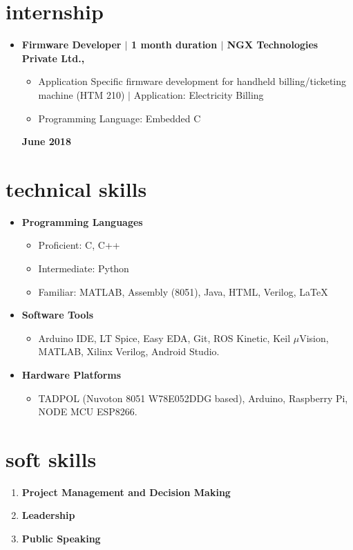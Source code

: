 \documentclass[margin,line]{res}
\begin{document}
\begin{resume}
		\section{\sc internship}

			\begin{itemize}
				\item \textbf{Firmware Developer $\vert$ 1 month duration $\vert$ NGX Technologies Private Ltd.,}  \newline
					\begin{itemize}
						\item Application Specific firmware development for handheld billing/ticketing machine (HTM 210) $\vert$ Application: Electricity Billing
						\item Programming Language: Embedded C
					\end{itemize}
				\null \hfill \textbf{June 2018} \newline	
			\end{itemize}

		\section{\sc technical skills}

			\begin{itemize}
				\item \textbf{Programming Languages}
				\begin{itemize}
					\item Proficient: C, C++
					\item Intermediate: Python
					\item Familiar: MATLAB, Assembly (8051), Java, HTML, Verilog, \LaTeX
				\end{itemize}
				\item \textbf{Software Tools}
				\begin{itemize}
					\item Arduino IDE, LT Spice, Easy EDA, Git, ROS Kinetic, Keil $\mu$Vision, MATLAB, Xilinx Verilog, Android Studio.
				\end{itemize}
				\item \textbf{Hardware Platforms}
				\begin{itemize}
					\item TADPOL (Nuvoton 8051 W78E052DDG based), Arduino, Raspberry Pi, NODE MCU ESP8266.  
				\end{itemize}
			\end{itemize}

		\section{\sc soft skills}
			\begin{enumerate}
				\item \textbf{Project Management and Decision Making}
				\item \textbf{Leadership}
				\item \textbf{Public Speaking}
			\end{enumerate}


\end{resume}
\end{document}
